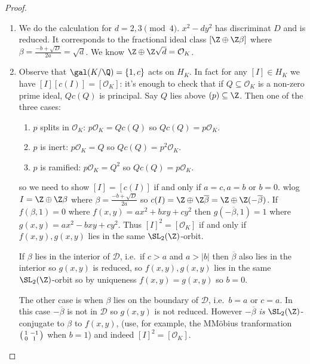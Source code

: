 \documentclass[a4paper]{article}
\renewcommand*{\O}{\mathcal{O}}
\begin{document}
\begin{proof}\leavevmode
  \begin{enumerate}
  \item We do the calculation for \(d = 2, 3 \pmod 4\). \(x^2 - dy^2\) has discriminat \(D\) and is reduced. It corresponds to the fractional ideal class \([\Z \oplus \Z \beta]\) where \(\beta = \frac{-b + \sqrt D}{2a} = \sqrt d\). We know \(\Z \oplus \Z \sqrt d = \O_K\).
  \item Observe that \(\gal(K/\Q) = \{1, c\}\) acts on \(H_K\). In fact for any \([I] \in H_K\) we have \([I] [c(I)] = [\O_K]\): it's enough to check that if \(Q \subseteq \O_K\) is a non-zero prime ideal, \(Q c(Q)\) is principal. Say \(Q\) lies above \((p) \subseteq \Z\). Then one of the three cases:
    \begin{enumerate}
    \item \(p\) splits in \(\O_K\): \(p \O_K = Q c(Q)\) so \(Q c(Q) = p\O_K\).
    \item \(p\) is inert: \(p \O_K = Q\) so \(Q c(Q) = p^2 \O_K\).
    \item \(p\) is ramified: \(p \O_K = Q^2\) so \(Q c(Q) = p\O_K\).
    \end{enumerate}
    so we need to show \([I] = [c(I)]\) if and only if \(a = c, a = b\) or \(b = 0\). wlog \(I = \Z \oplus \Z \beta\) where \(\beta = \frac{-b + \sqrt D}{2a}\) so \(c(I) = \Z \oplus \Z \overline \beta = \Z \oplus \Z(-\overline \beta)\). If \(f(\beta, 1) = 0\) where \(f(x, y) = ax^2 + bxy + cy^2\) then \(g(-\overline \beta, 1) = 1\) where \(g(x, y) = ax^2 - bxy + cy^2\). Thus \([I]^2 = [\O_K]\) if and only if \(f(x, y), g(x, y)\) lies in the same \(\SL_2(\Z)\)-orbit.

    If \(\beta\) lies in the interior of \(\mathcal D\), i.e.\ if \(c > a\) and \(a > |b|\) then \(\overline \beta\) also lies in the interior so \(g(x, y)\) is reduced, so \(f(x, y), g(x, y)\) lies in the same \(\SL_2(\Z)\)-orbit so by uniqueness \(f(x, y) = g(x,y)\) so \(b = 0\).

    The other case is when \(\beta\) lies on the boundary of \(\mathcal D\), i.e.\ \(b = a\) or \(c = a\). In this case \(-\overline \beta\) is not in \(\mathcal D\) so \(g(x, y)\) is not reduced. However \(-\overline \beta\) \emph{is} \(\SL_2(\Z)\)-conjugate to \(\beta\) to \(f(x, y)\), (use, for example, the MMöbius tranformation \(
    \begin{psmallmatrix}
      1 & -1 \\
      0 & 1
    \end{psmallmatrix}
    \) when \(b = 1\)) and indeed \([I]^2 = [\O_K]\).
  \end{enumerate}
\end{proof}
\end{document}
